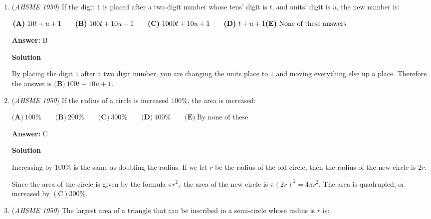 \begin{enumerate}
 
 \begin{align*} 2\cdot[2(-\dfrac{y+3}{2})^2+6(-\dfrac{y+3}{2})+5y+1]&=2\cdot 0\\ (y+3)^2 -6y-18+10y+2&=0\\ y^2+6y+9-6y-18+10y+2&=0\\ y^2+10y-7&=0 \end{align*}


 Therefore the answer is $\boxed{\textbf{(C)}\ y^{2}+10y-7=0}$



	\item (\textit{AHSME 1950}) If the digit $1$ is placed after a two digit number whose tens' digit is $t$, and units' digit is $u$, the new number is:


 $\textbf{(A)}\ 10t+u+1\qquad\textbf{(B)}\ 100t+10u+1\qquad\textbf{(C)}\ 1000t+10u+1\qquad\textbf{(D)}\ t+u+1\qquad\\ \textbf{(E)}\ \text{None of these answers}$

 \textbf{Answer: }B



\textbf{Solution}

By placing the digit $1$ after a two digit number, you are changing the units place to $1$ and moving everything else up a place. Therefore the answer is $\boxed{\textbf{(B)}\ 100t+10u+1}$.

 


	\item (\textit{AHSME 1950}) If the radius of a circle is increased $100\%$, the area is increased:


 $\textbf{(A)}\ 100\%\qquad\textbf{(B)}\ 200\%\qquad\textbf{(C)}\ 300\%\qquad\textbf{(D)}\ 400\%\qquad\textbf{(E)}\ \text{By none of these}$

 \textbf{Answer: }C



\textbf{Solution}

Increasing by $100\%$ is the same as doubling the radius. If we let $r$ be the radius of the old circle, then the radius of the new circle is $2r.$

 Since the area of the circle is given by the formula $\pi r^2,$ the area of the new circle is $\pi (2r)^2 = 4\pi r^2.$ The area is quadrupled, or increased by $\boxed{\mathrm{(C) }300\%.}$



	\item (\textit{AHSME 1950}) The largest area of a triangle that can be inscribed in a semi-circle whose radius is $r$ is:



\end{enumerate}

